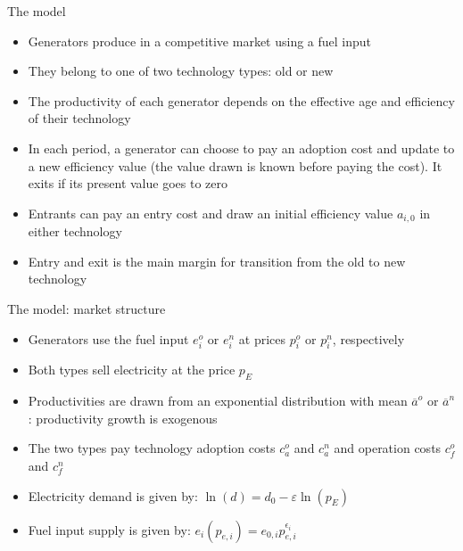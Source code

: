 \documentclass{beamer}
\begin{document}
\begin{frame}{The model}

\begin{itemize}
 \item Generators produce in a competitive market using a fuel input
 \item They belong to one of two technology types: old or new
 \item The productivity of each generator depends on the effective age and efficiency of their technology
 \item In each period, a generator can choose to pay an adoption cost and update to a new efficiency value (the value drawn is known before paying the cost). It exits if its present value goes to zero
 \item Entrants can pay an entry cost and draw an initial efficiency value $a_{i,0}$ in either technology
 \item Entry and exit is the main margin for transition from the old to new technology
\end{itemize}
    
\end{frame}
\begin{frame}{The model: market structure}
\begin{itemize}
 \item Generators use the fuel input $e_i^o$ or $e_i^n$ at prices $p_i^o$ or $p_i^n$, respectively
  \item Both types sell electricity at the price $p_E$
 \item Productivities are drawn from an exponential distribution with mean $\overline{a}^o$ or $\overline{a}^n$: productivity growth is exogenous
 \item The two types pay technology adoption costs $c_a^o$ and $c_a^n$ and operation costs $c_f^o$ and $c_f^n$
 \hfill \break
 \item Electricity demand is given by: $\ln(d) = d_0-\varepsilon\ln(p_E)$
 \item Fuel input supply is given by:  $e_i(p_{e,i}) = e_{0,i}p_{e,i}^{\epsilon_{i}}$

\end{itemize}
    
\end{frame}
\end{document}
